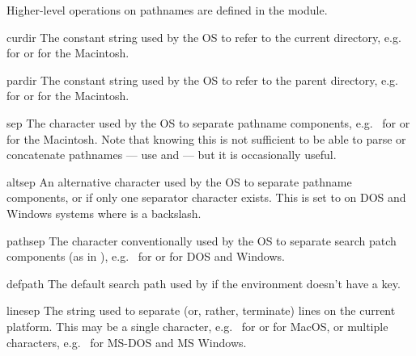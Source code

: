 Higher-level operations on pathnames are defined in the
 module.


\begin{datadesc}{curdir}
The constant string used by the OS to refer to the current directory,
e.g.\  for \POSIX{} or  for the Macintosh.
\end{datadesc}

\begin{datadesc}{pardir}
The constant string used by the OS to refer to the parent directory,
e.g.\  for \POSIX{} or  for the Macintosh.
\end{datadesc}

\begin{datadesc}{sep}
The character used by the OS to separate pathname components,
e.g.\ \character{/} for \POSIX{} or \character{:} for the Macintosh.
Note that knowing this is not sufficient to be able to parse or
concatenate pathnames --- use  and
 --- but it is occasionally useful.
\end{datadesc}

\begin{datadesc}{altsep}
An alternative character used by the OS to separate pathname components,
or  if only one separator character exists.  This is set to
\character{/} on DOS and Windows systems where  is a backslash.
\end{datadesc}

\begin{datadesc}{pathsep}
The character conventionally used by the OS to separate search patch
components (as in ), e.g.\ \character{:} for \POSIX{} or
\character{;} for DOS and Windows.
\end{datadesc}

\begin{datadesc}{defpath}
The default search path used by  if the environment
doesn't have a  key.
\end{datadesc}

\begin{datadesc}{linesep}
The string used to separate (or, rather, terminate) lines on the
current platform.  This may be a single character,
e.g.\  for \POSIX{} or  for MacOS, or multiple
characters, e.g.\  for MS-DOS and MS Windows.
\end{datadesc}
